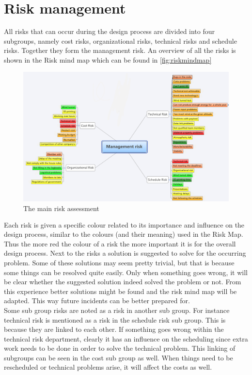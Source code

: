 \documentclass[a4paper]{report}
\begin{document}
\chapter{Risk management}
All risks that can occur during the design process are divided into four subgroups, namely cost risks, organizational risks, technical risks and schedule risks. Together they form the management risk. An overview of all the risks is shown in the Risk mind map which can be found in \autoref{fig:riskmindmap}\\

\begin{figure}[H]
\label{fig:riskmindmap}
\centering
\includegraphics[scale=0.6]{Figures/Riskmindmapmain.png}
\caption{The main risk assessment }
\end{figure}

Each risk is given a specific colour related to its importance and influence on the design process, similar to the colours (and their meaning) used in the Risk Map. Thus the more red the colour of a risk the more important it is for the overall design process. Next to the risks a solution is suggested to solve for the occurring problem. Some of these solutions may seem pretty trivial, but that is because some things can be resolved quite easily. Only when something goes wrong, it will be clear whether the suggested solution indeed solved the problem or not. From this experience better solutions might be found and the risk mind map will be adapted. This way future incidents can be better prepared for. \\
Some sub group risks are noted as a risk in another sub group. For instance technical risk is mentioned as a risk in the schedule risk sub group. This is because they are linked to each other. If something goes wrong within the technical risk department, clearly it has an influence on the scheduling since extra work needs to be done in order to solve the technical problem. This linking of subgroups can be seen in the cost sub group as well. When things need to be rescheduled or technical problems arise, it will affect the costs as well.
\end{document}
